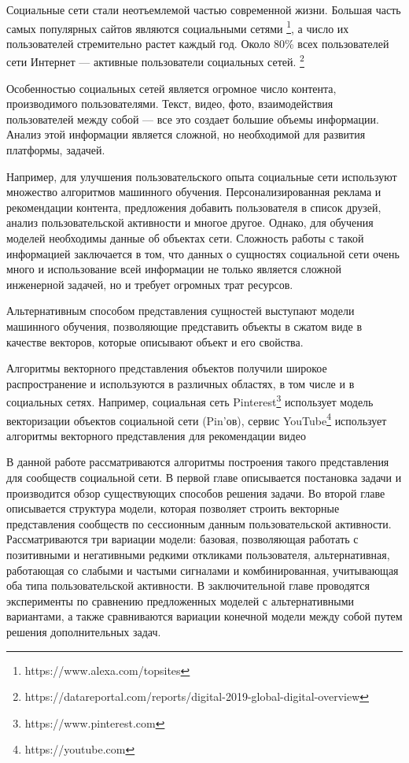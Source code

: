 \documentclass[times,specification,annotation]{itmo-student-thesis}
\begin{document}
\startprefacepage

\startrelatedwork

Социальные сети стали неотъемлемой частью современной жизни. Большая часть самых популярных сайтов являются социальными сетями \footnote{https://www.alexa.com/topsites}, а число их пользователей стремительно растет каждый год. Около 80\% всех пользователей сети Интернет --- активные пользователи социальных сетей. \footnote{https://datareportal.com/reports/digital-2019-global-digital-overview}  

Особенностью социальных сетей является огромное число контента, производимого пользователями. Текст, видео, фото, взаимодействия пользователей между собой --- все это создает большие объемы информации. Анализ этой информации является сложной, но необходимой для развития платформы, задачей.

Например, для улучшения пользовательского опыта социальные сети используют множество алгоритмов машинного обучения. Персонализированная реклама и рекомендации контента, предложения добавить пользователя в список друзей, анализ пользовательской активности и многое другое. Однако, для обучения моделей необходимы данные об объектах сети. Сложность работы с такой информацией заключается в том, что данных о сущностях социальной сети очень много и использование всей информации не только является сложной инженерной задачей, но и требует огромных трат ресурсов.   

Альтернативным способом представления сущностей выступают модели машинного обучения, позволяющие представить объекты в сжатом виде в качестве векторов, которые описывают объект и его свойства.

Алгоритмы векторного представления объектов получили широкое распространение и используются в различных областях, в том числе и в социальных сетях. Например, социальная сеть Pinterest\footnote{https://www.pinterest.com}  использует модель векторизации объектов социальной сети (Pin'ов)\cite{Liu2017}, сервис YouTube\footnote{https://youtube.com} использует алгоритмы векторного представления для рекомендации видео\cite{Covington2016} 

В данной работе рассматриваются алгоритмы построения такого представления для сообществ социальной сети. В первой главе описывается постановка задачи и производится обзор существующих способов решения задачи. Во второй главе описывается структура модели, которая позволяет строить векторные представления сообществ по сессионным данным пользовательской активности. Рассматриваются три вариации модели: базовая, позволяющая работать с позитивными и негативными редкими откликами пользователя, альтернативная, работающая со слабыми и частыми сигналами и комбинированная, учитывающая оба типа пользовательской активности. В заключительной главе проводятся эксперименты по сравнению предложенных моделей с альтернативными вариантами, а также сравниваются вариации конечной модели между собой путем решения дополнительных задач. 
\end{document}
